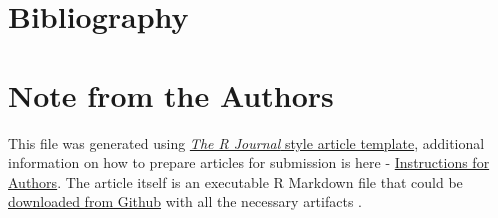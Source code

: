 \hypertarget{bibliography}{%
\section{Bibliography}\label{bibliography}}

\newpage

\hypertarget{note-from-the-authors}{%
\section{Note from the Authors}\label{note-from-the-authors}}

This file was generated using
\href{https://github.com/rstudio/rticles}{\emph{The R Journal} style
article template}, additional information on how to prepare articles for
submission is here -
\href{https://journal.r-project.org/share/author-guide.pdf}{Instructions
for Authors}. The article itself is an executable R Markdown file that
could be
\href{https://github.com/ivbsoftware/big-data-final-2/blob/master/docs/R_Journal/big-data-final-2/}{downloaded
from Github} with all the necessary artifacts
\citep{ivbsoftware_big-data-final}.


\address{%
Sumaira Afzal\\
York University School of Continuing Studies\\
\\
}


\address{%
Viraja Ketkar\\
York University School of Continuing Studies\\
\\
}


\address{%
Murlidhar Loka\\
York University School of Continuing Studies\\
\\
}


\address{%
Vadim Spirkov\\
York University School of Continuing Studies\\
\\
}


